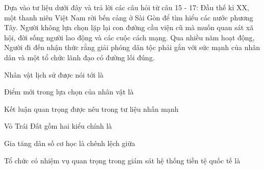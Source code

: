\begin{baidoc}
\item[] Dựa vào tư liệu dưới đây và trả lời các câu hỏi từ câu 15 - 17:
Đầu thế kỉ XX, một thanh niên Việt Nam rời bến cảng ở Sài Gòn để tìm hiểu các nước phương Tây. Người không lựa chọn lặp lại con đường cầu viện cũ mà muốn quan sát xã hội, đời sống người lao động và các cuộc cách mạng. Qua nhiều năm hoạt động, Người đi đến nhận thức rằng giải phóng dân tộc phải gắn với sức mạnh của nhân dân và một tổ chức lãnh đạo có đường lối đúng.

\begin{ex}
Nhân vật lịch sử được nói tới là
\end{ex}

\begin{ex}
Điểm mới trong lựa chọn của nhân vật là
\end{ex}

\begin{ex}
Kết luận quan trọng được nêu trong tư liệu nhấn mạnh
\end{ex}
\end{baidoc}


\begin{ex}
Vỏ Trái Đất gồm hai kiểu chính là
\end{ex}

\begin{ex}
Gia tăng dân số cơ học là chênh lệch giữa
\end{ex}

\begin{ex}
Tổ chức có nhiệm vụ quan trọng trong giám sát hệ thống tiền tệ quốc tế là
\end{ex}

